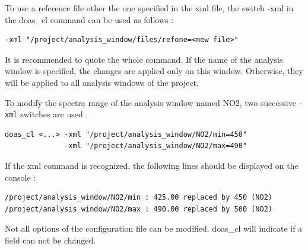 To use a reference file other the one specified in the xml file, the
switch -xml in the doas\_cl command can be used as follows :

\begin{Verbatim}[fontfamily=courier,fontsize=\relsize{-2}]
-xml "/project/analysis_window/files/refone=<new file>"
\end{Verbatim}

It is recommended to quote the whole command.  If the name of the
analysis window is specified, the changes are applied only on this
window.  Otherwise, they will be applied to all analysis windows of
the project.

To modify the spectra range of the analysis window named NO2, two
successive \texttt{-xml} switches are used :

\begin{Verbatim}[fontfamily=courier,fontsize=\relsize{-2}]
doas_cl <...> -xml "/project/analysis_window/NO2/min=450"
              -xml "/project/analysis_window/NO2/max=490"
\end{Verbatim}

If the xml command is recognized, the following lines should be
displayed on the console :

\begin{Verbatim}[fontfamily=courier,fontsize=\relsize{-2}]
/project/analysis_window/NO2/min : 425.00 replaced by 450 (NO2)
/project/analysis_window/NO2/max : 490.00 replaced by 500 (NO2)
\end{Verbatim}

Not all options of the configuration file can be modified.  doas\_cl
will indicate if a field can not be changed.

